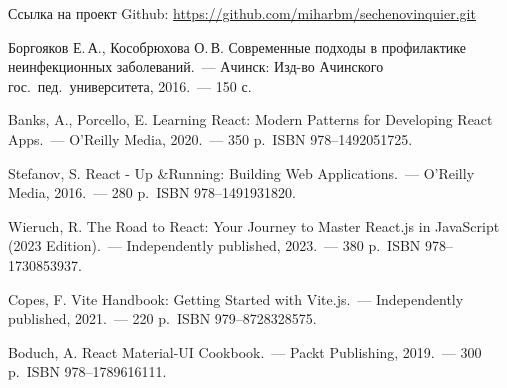 \documentclass[a4paper,12pt]{article}
\begin{document}
    Ссылка на проект Github:
    \url{https://github.com/miharbm/sechenovinquier.git}


    \newpage
    \begin{thebibliography}{99}

         Боргояков Е.\,А., Кособрюхова О.\,В. Современные подходы в профилактике неинфекционных заболеваний.\ — Ачинск: Изд-во Ачинского гос.\ пед.\ университета, 2016.\ — 150 с.

         Banks, A., Porcello, E. Learning React: Modern Patterns for Developing React Apps.\ — O'Reilly Media, 2020.\ — 350 p.\ ISBN 978--1492051725.

         Stefanov, S. React - Up \&Running: Building Web Applications.\ — O'Reilly Media, 2016.\ — 280 p.\ ISBN 978--1491931820.

         Wieruch, R. The Road to React: Your Journey to Master React.js in JavaScript (2023 Edition).\ — Independently published, 2023.\ — 380 p.\ ISBN 978--1730853937.

         Copes, F. Vite Handbook: Getting Started with Vite.js.\ — Independently published, 2021.\ — 220 p.\ ISBN 979--8728328575.

         Boduch, A. React Material-UI Cookbook.\ — Packt Publishing, 2019.\ — 300 p.\ ISBN 978--1789616111.

    \end{thebibliography}
\end{document}
